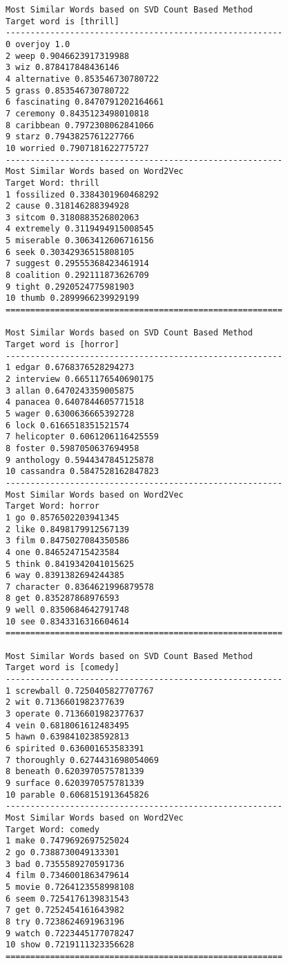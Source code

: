 \documentclass[12pt, letterpaper]{article}
\begin{document}
\begin{lstlisting}
Most Similar Words based on SVD Count Based Method
Target word is [thrill]
--------------------------------------------------------
0 overjoy 1.0
2 weep 0.9046623917319988
3 wiz 0.878417848436146
4 alternative 0.853546730780722
5 grass 0.853546730780722
6 fascinating 0.8470791202164661
7 ceremony 0.8435123498010818
8 caribbean 0.7972308062841066
9 starz 0.7943825761227766
10 worried 0.7907181622775727
--------------------------------------------------------
Most Similar Words based on Word2Vec
Target Word: thrill
1 fossilized 0.3384301960468292
2 cause 0.318146288394928
3 sitcom 0.3180883526802063
4 extremely 0.3119494915008545
5 miserable 0.3063412606716156
6 seek 0.30342936515808105
7 suggest 0.29555368423461914
8 coalition 0.292111873626709
9 tight 0.2920524775981903
10 thumb 0.2899966239929199
========================================================

Most Similar Words based on SVD Count Based Method
Target word is [horror]
--------------------------------------------------------
1 edgar 0.6768376528294273
2 interview 0.6651176540690175
3 allan 0.6470243359005875
4 panacea 0.6407844605771518
5 wager 0.6300636665392728
6 lock 0.6166518351521574
7 helicopter 0.6061206116425559
8 foster 0.5987050637694958
9 anthology 0.5944347845125878
10 cassandra 0.5847528162847823
--------------------------------------------------------
Most Similar Words based on Word2Vec
Target Word: horror
1 go 0.8576502203941345
2 like 0.8498179912567139
3 film 0.8475027084350586
4 one 0.846524715423584
5 think 0.8419342041015625
6 way 0.8391382694244385
7 character 0.8364621996879578
8 get 0.835287868976593
9 well 0.8350684642791748
10 see 0.8343316316604614
========================================================

Most Similar Words based on SVD Count Based Method
Target word is [comedy]
--------------------------------------------------------
1 screwball 0.7250405827707767
2 wit 0.7136601982377639
3 operate 0.7136601982377637
4 vein 0.6818061612483495
5 hawn 0.6398410238592813
6 spirited 0.636001653583391
7 thoroughly 0.6274431698054069
8 beneath 0.6203970575781339
9 surface 0.6203970575781339
10 parable 0.6068151913645826
--------------------------------------------------------
Most Similar Words based on Word2Vec
Target Word: comedy
1 make 0.7479692697525024
2 go 0.7388730049133301
3 bad 0.7355589270591736
4 film 0.7346001863479614
5 movie 0.7264123558998108
6 seem 0.7254176139831543
7 get 0.7252454161643982
8 try 0.7238624691963196
9 watch 0.7223445177078247
10 show 0.7219111323356628
========================================================


\end{lstlisting}
\end{document}
